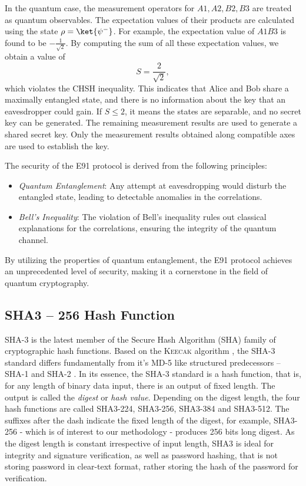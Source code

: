 \documentclass{article}
\begin{document}
In the quantum case, the measurement operators for \( A1, A2, B2, B3 \) are treated as quantum observables. The expectation values of their products are calculated using the state \( \rho = \ket{\psi^{-}}\). For example, the expectation value of \( A1B3 \) is found to be $\displaystyle  -\frac{1}{\sqrt{2}} $. By computing the sum of all these expectation values, we obtain a value of
\[
    S = \frac{2}{\sqrt{2}},
\]
which violates the CHSH inequality. This indicates that Alice and Bob share a maximally entangled state, and there is no information about the key that an eavesdropper could gain. If \( S \leq 2 \), it means the states are separable, and no secret key can be generated.
The remaining measurement results are used to generate a shared secret key. Only the measurement results obtained along compatible axes are used to establish the key.

The security of the E91 protocol is derived from the following principles:
\begin{itemize}
    \item \textit{Quantum Entanglement}: Any attempt at eavesdropping would disturb the entangled state, leading to detectable anomalies in the correlations.
    \item \textit{Bell's Inequality}: The violation of Bell's inequality rules out classical explanations for the correlations, ensuring the integrity of the quantum channel.
\end{itemize}

By utilizing the properties of quantum entanglement, the E91 protocol achieves an unprecedented level of security, making it a cornerstone in the field of quantum cryptography.
\subsection{SHA3 -- 256 Hash Function}
\label{sec:sha3}
SHA-3 is the latest member \cite{nistHashFunctions} of the Secure Hash Algorithm (SHA) family of cryptographic hash functions. Based on the K\textsc{eecak} algorithm \cite{Bbbbbbb2011}, the SHA-3 standard differs fundamentally from it's MD-5 \cite{rivest1992md5} like structured predecessors -- SHA-1 and SHA-2 \cite{penard2008secure}. In its essence, the SHA-3 standard is a hash function, that is, for any length of binary data input, there is an output of fixed length. The output is called the \textit{digest} or \textit{hash value}. Depending on the digest length, the four hash functions are called SHA3-224, SHA3-256, SHA3-384 and SHA3-512. The suffixes after the dash indicate the fixed length of the digest, for example, SHA3-256 - which is of interest to our methodology - produces 256 bits long digest. As the digest length is constant irrespective of input length, SHA3 is ideal for integrity and signature verification, as well as password hashing, that is not storing password in clear-text format, rather storing the hash of the password for verification.
\end{document}
